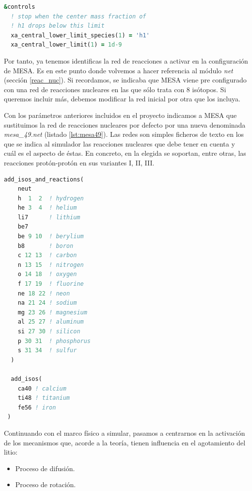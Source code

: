 \begin{lstlisting}[language=Fortran, float, caption={Parametrización de la condición de parada de la simulación cuando se produce el agotamiento de H en el núcleo de la estrella.}, label={lst:stop_params}]
&controls
  ! stop when the center mass fraction of 
  ! h1 drops below this limit
  xa_central_lower_limit_species(1) = 'h1'
  xa_central_lower_limit(1) = 1d-9
\end{lstlisting}


Por tanto, ya tenemos identificas la red de reacciones a activar en la configuración de MESA. Es en este punto donde volvemos a hacer referencia al módulo \textit{net} (sección  \ref{reac_nuc}). Si recordamos, se indicaba que MESA viene pre configurado con una red de reacciones nucleares en las que sólo trata con 8 isótopos. Si queremos incluir más, debemos modificar la red inicial por otra que los incluya.\par

Con los parámetros anteriores incluidos en el proyecto indicamos a MESA que sustituimos la red de reacciones nucleares por defecto por una nueva denominada \textit{mesa\_49.net} (listado \ref{lst:mesa49}). Las redes son simples ficheros de texto en los que se indica al simulador las reacciones nucleares que debe tener en cuenta y cuál es el aspecto de éstas. En concreto, en la elegida se soportan, entre otras, las reacciones protón-protón en sus variantes I, II, III.\par

\begin{lstlisting}[language=Fortran, float, caption={Red de reacciones mesa\_49.net. Esta red incluye un tratamiento detallado de la para los elementos ligeros H, He, Li y Be.}, label={lst:mesa49}]
  add_isos_and_reactions(
    neut
    h  1  2  ! hydrogen
    he 3  4  ! helium
    li7      ! lithium
    be7
    be 9 10  ! berylium
    b8       ! boron
    c 12 13  ! carbon
    n 13 15  ! nitrogen
    o 14 18  ! oxygen
    f 17 19  ! fluorine
    ne 18 22 ! neon
    na 21 24 ! sodium
    mg 23 26 ! magnesium
    al 25 27 ! aluminum
    si 27 30 ! silicon
    p 30 31  ! phosphorus
    s 31 34  ! sulfur
  )

  add_isos(
    ca40 ! calcium
    ti48 ! titanium
    fe56 ! iron
 )
\end{lstlisting}


Continuando con el marco físico a simular, pasamos a centrarnos en la activación de los mecanismos que, acorde a la teoría, tienen influencia en el agotamiento del litio:
\begin{itemize}
    \item Proceso de difusión.
    \item Proceso de rotación.
\end{itemize}

